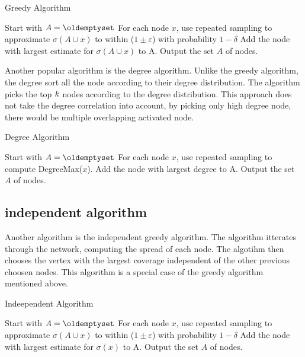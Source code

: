 { \begin{algorithm}
\caption{Greedy Algorithm}
\begin{algorithmic}[1]
\State Start with $A = \oldemptyset$
\State For each node $x$, use repeated sampling to approximate $\sigma(A \cup {x}) $ to within ($1 \pm \varepsilon$) with probability
$1 − \delta$
\State Add the node with largest estimate for $\sigma(A \cup {x})$ to A.
\EndWhile
\State Output the set $A$ of nodes.
\end{algorithmic}
\end{algorithm}

Another popular algorithm is the degree algorithm\cite{MaximizeSpread2015}. Unlike the greedy algorithm, the degree sort all the node according to their degree distribution. The algorithm picks the top $\it{k}$ nodes according to the degree distribution. This approach does not take the degree correlation into account, by picking only high degree node, there would be multiple overlapping activated node.

\begin{algorithm}
\caption{Degree Algorithm}
\begin{algorithmic}[1]
\State Start with $A = \oldemptyset$
\State For each node $x$, use repeated sampling to compute DegreeMax($x$).
\State Add the node with largest degree to A.
\EndWhile
\State Output the set $A$ of nodes.
\end{algorithmic}
\end{algorithm}

\subsection{independent algorithm}
Another algorithm is the independent greedy algorithm. The algorithm itterates through the network, computing the spread of each node. The algotihm then chooses the vertex with the largest coverage independent of the other previous choosen nodes. This algorithm is a special case of the greedy algorithm mentioned above.

\begin{algorithm}
\caption{Indeependent Algorithm}
\begin{algorithmic}[1]
\State Start with $A = \oldemptyset$
\State For each node $x$, use repeated sampling to approximate $\sigma(A \cup {x}) $ to within ($1 \pm \varepsilon$) with probability
$1 − \delta$
\State Add the node with largest estimate for $\sigma({x})$ to A.
\EndWhile
\State Output the set $A$ of nodes.
\end{algorithmic}
\end{algorithm}


}
